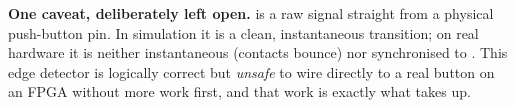 \begin{warning}
\textbf{One caveat, deliberately left open.}  is a raw signal straight from a
physical push-button pin. In simulation it is a clean, instantaneous transition; on real hardware it
is neither instantaneous (contacts bounce) nor synchronised to . This edge detector is
logically correct but \emph{unsafe} to wire directly to a real button on an FPGA without more work
first, and that work is exactly what  takes up.
\end{warning}
